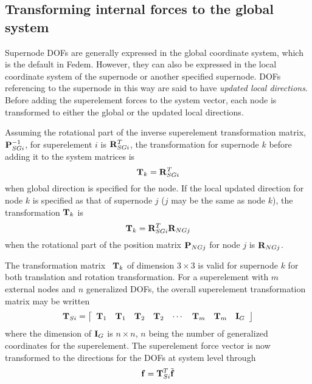 {\subsection{Transforming internal forces to the global system}

Supernode DOFs are generally expressed in the global coordinate system,
which is the default in Fedem.
However, they can also be expressed in the local coordinate system of the
supernode or another specified supernode.
DOFs referencing to the supernode in this way are said to have
{\it updated local directions}.
Before adding the superelement forces to the system vector,
each node is transformed to either the global or the updated local directions.

Assuming the rotational part of the inverse superelement transformation matrix,
${\bf P}_{SGi}^{-1}$, for superelement $i$ is ${\bf R}^T_{SGi}$, the
transformation for supernode $k$ before adding it to the system matrices is
%
\begin{equation}
{\bf T}_k = {\bf R}_{SGi}^T
\label{eqSC:57}
\end{equation}
%
when global direction is specified for the node.
If the local updated direction for node $k$ is specified as that of supernode
$j$ ($j$ may be the same as node $k$), the transformation ${\bf T}_k$ is
%
\begin{equation}
{\bf T}_k = {\bf R}_{SGi}^T {\bf R}_{NGj}
\label{eqSC:58}
\end{equation}
%
when the rotational part of the position matrix ${\bf P}_{NGj}$ for node $j$
is ${\bf R}_{NGj}$.

The transformation matrix ~${\bf T}_k$ of dimension $3\times3$ is valid for
supernode $k$ for both translation and rotation transformation.
For a superelement with $m$ external nodes and $n$ generalized DOFs,
the overall superelement transformation matrix may be written
%
\begin{equation}
{\mf T}_{Si} = \left\lceil \begin{array}{*{20}c}
{\mf T}_1 & {\mf T}_1 & {\mf T}_2 & {\mf T}_2 & \cdots &
{\mf T}_m & {\mf T}_m & {\mf I}_G \\
\end{array} \right\rfloor
\label{eqSC:59}
\end{equation}
%
where the dimension of ${\bf I}_G$ is $n\!\times\!n$, $n$ being the number of
generalized coordinates for the superelement.
The superelement force vector is now transformed to the directions for the DOFs
at system level through
%
\begin{equation}
{\bf f} = {\bf T}_{Si}^T \tilde{\bf f}
\label{eqSC:forceTrans}
\end{equation}

}
